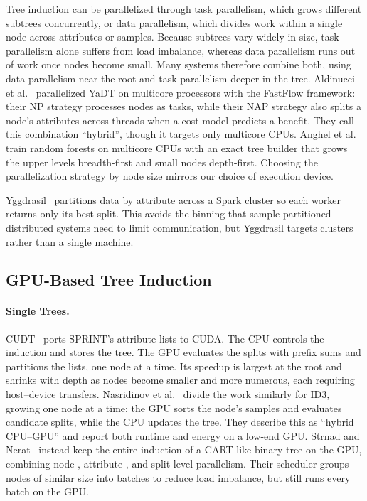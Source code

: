 Tree induction can be parallelized through task parallelism, which grows different subtrees concurrently, or data parallelism, which divides work within a single node across attributes or samples. Because subtrees vary widely in size, task parallelism alone suffers from load imbalance, whereas data parallelism runs out of work once nodes become small. Many systems therefore combine both, using data parallelism near the root and task parallelism deeper in the tree. Aldinucci et al.~\cite{aldinucci2014fastflow} parallelized YaDT on multicore processors with the FastFlow framework: their NP strategy processes nodes as tasks, while their NAP strategy also splits a node's attributes across threads when a cost model predicts a benefit. They call this combination ``hybrid'', though it targets only multicore CPUs.  Anghel et al.~\cite{anghel2019bfdn} train random forests on multicore CPUs with an exact tree builder that grows the upper levels breadth-first and small nodes depth-first.  Choosing the parallelization strategy by node size mirrors our choice of execution device.

Yggdrasil~\cite{abuzaid2016yggdrasil} partitions data by attribute across a Spark cluster so each worker returns only its best split. This avoids the binning that sample-partitioned distributed systems need to limit communication, but Yggdrasil targets clusters rather than a single machine.

\subsection{GPU-Based Tree Induction}

\paragraph{Single Trees.} CUDT~\cite{lo2014cudt} ports SPRINT's attribute lists to CUDA. The CPU controls the induction and stores the tree. The GPU evaluates the splits with prefix sums and partitions the lists, one node at a time. Its speedup is largest at the root and shrinks with depth as nodes become smaller and more numerous, each requiring host--device transfers. Nasridinov et al.~\cite{nasridinov2014gpu} divide the work similarly for ID3, growing one node at a time: the GPU sorts the node's samples and evaluates candidate splits, while the CPU updates the tree. They describe this as ``hybrid CPU--GPU'' and report both runtime and energy on a low-end GPU.  Strnad and Nerat~\cite{strnad2016gpu} instead keep the entire induction of a CART-like binary tree on the GPU, combining node-, attribute-, and split-level parallelism. Their scheduler groups nodes of similar size into batches to reduce load imbalance, but still runs every batch on the GPU.

